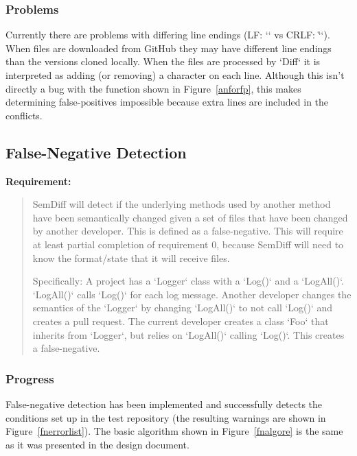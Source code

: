 \documentclass[draftclsnofoot,onecolumn]{IEEEtran}
\begin{document}
\subsubsection{Problems}

Currently there are problems with differing line endings (LF: `\n` vs CRLF: 
`\r\n`). When files are downloaded from GitHub they may have different line 
endings than the versions cloned locally. When the files are processed by 
`Diff` it is interpreted as adding (or removing) a character on each line. 
Although this isn’t directly a bug with the function shown in 
Figure~\ref{anforfp}, this makes determining false-positives impossible because 
extra lines are included in the conflicts.





\subsection{False-Negative Detection}%

\textbf{Requirement:}

\begin{quote}

SemDiff will detect if the underlying methods used by another method have been 
semantically changed given a set of files that have been changed by another 
developer. This is defined as a false-negative. This will require at least 
partial completion of requirement 0, because SemDiff will need to know the 
format/state that it will receive files.

Specifically: A project has a `Logger` class with a `Log()` and a `LogAll()`. 
`LogAll()` calls `Log()` for each log message. Another developer changes the 
semantics of the `Logger` by changing `LogAll()` to not call `Log()` and 
creates a pull request. The current developer creates a class `Foo` that 
inherits from `Logger`, but relies on `LogAll()` calling `Log()`. This creates 
a false-negative.

\end{quote}

\subsubsection{Progress}

False-negative detection has been implemented and successfully detects the 
conditions set up in the test repository (the resulting warnings are shown in 
Figure~\ref{fnerrorlist}). The basic algorithm shown in Figure~\ref{fnalgore} 
is the same as it was presented in the design document.
\end{document}
